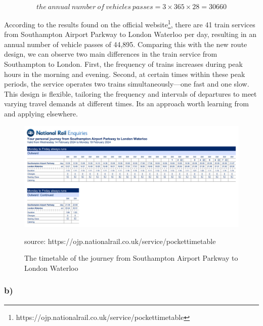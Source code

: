 \documentclass[letterpaper,12pt,leqno]{article}
\begin{document}
	\[the\ annual\ number\ of\ vehicles\ passes=3\times365\times28=30660\]
	
	According to the results found on the official website\footnote{https://ojp.nationalrail.co.uk/service/pockettimetable}, there are 41
	train services from Southampton Airport Parkway to London Waterloo per
	day, resulting in an annual number of vehicle passes of 44,895.
	Comparing this with the new route design, we can observe two main
	differences in the train service from Southampton to London. First, the
	frequency of trains increases during peak hours in the morning and
	evening. Second, at certain times within these peak periods, the service
	operates two trains simultaneously---one fast and one slow. This design
	is flexible, tailoring the frequency and intervals of departures to meet
	varying travel demands at different times. It\textquotesingle s an
	approach worth learning from and applying elsewhere.
	
	\begin{figure}[H]
		\centering
		\includegraphics[scale=0.3]{figure/timetable.png}
		\caption{The timetable of the journey from Southampton Airport Parkway to London Waterloo}
		\small{source: https://ojp.nationalrail.co.uk/service/pockettimetable}
		\label{fig:timetable}
	\end{figure}
	
	\subsubsection{b)}\label{2uxff09}
	
\end{document}
